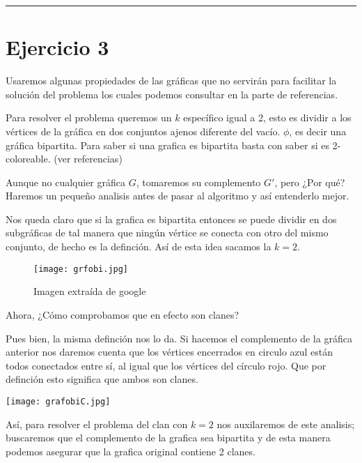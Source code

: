 \documentclass[12pt,letterpaper]{article}
\newcommand{\lineaxd}{{\color{brown}\rule{\linewidth}{0.5mm}}}
\begin{document}
\lineaxd

\section*{Ejercicio 3}

Usaremos algunas propiedades de las gráficas que no servirán para facilitar la solución del problema los cuales podemos consultar en la parte de referencias.

Para resolver el problema queremos un $k$ específico igual a 2, esto es dividir a los vértices de la gráfica en dos conjuntos ajenos diferente del vacío. $\phi$, es decir una gráfica bipartita. Para saber si una grafica es bipartita basta con saber si es 2-coloreable. (ver referencias)

Aunque no cualquier gráfica $G$, tomaremos su complemento $G'$, pero ¿Por qué? Haremos un pequeño analisis antes de pasar al algoritmo  y así entenderlo mejor.

Nos queda claro que si la grafica es bipartita entonces se puede dividir en dos subgráficas de tal manera que ningún vértice se conecta con otro del mismo conjunto, de hecho es la definción. Así de esta idea sacamos la $k=2$.



\begin{figure}[htb]
        \centering
        \texttt{[image: grfobi.jpg]}
        \caption{Imagen extraída de google}
    \end{figure}


Ahora, ¿Cómo comprobamos que en efecto son clanes?

Pues bien, la misma definción nos lo da. Si hacemos el complemento de la gráfica anterior nos daremos cuenta que los vértices encerrados en circulo azul están todos conectados entre sí, al igual que los vértices del círculo rojo. Que por definción esto significa que ambos son clanes.

\begin{center}
    \texttt{[image: grafobiC.jpg]}
\end{center}

Así, para resolver el problema del clan con $k=2$ nos auxilaremos de este analisis; buscaremos que el complemento de la grafica sea bipartita y de esta manera podemos asegurar que la grafica original contiene 2 clanes.
\end{document}
